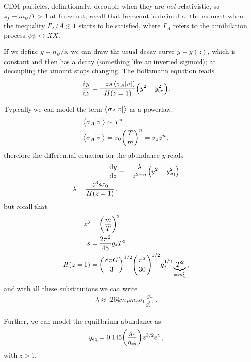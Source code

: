 \documentclass[main.tex]{subfiles}
\begin{document}

CDM particles, definitionally, decouple when they are \emph{not} relativistic, so \(z_f = m_\psi / T > 1\) at freezeout; recall that freezeout is defined as the moment when the inequality \(\Gamma _A / A \lesssim 1\) starts to be satisfied, where \(\Gamma _A\) refers to the annihilation process \(\psi \overline{\psi} \leftrightarrow X \overline{X}\). 

If we define \(y = n_\psi / s\), we can draw the usual decay curve \(y = y(z)\), which is constant and then has a decay (something like an inverted sigmoid); at decoupling the amount stops changing. 
The Boltzmann equation reads 
%
\begin{align}
\dv{y}{z} = \frac{- zs \expval{\sigma _A \abs{v}}}{H (z=1)} \qty(y^2 - y^2 _{\text{eq}})
\,.
\end{align}

Typically we can model the term \(\expval{\sigma_A \abs{v}}\) as a powerlaw: 
%
\begin{align}
\expval{\sigma_A \abs{v}} &\sim T^{n} \\
\expval{\sigma_A \abs{v}} &= \sigma_0 \qty( \frac{T}{m})^{n} = \sigma_0 \overline{z}^{n}
\,,
\end{align}
%
therefore the differential equation for the abundance \(y\) reads 
%
\begin{align}
\dv{y}{z} &= - \frac{\lambda}{z^{2 + n}} \qty(y^2 - y^2 _{\text{eq}}) \\
\lambda = \frac{z^3 s \sigma_0 }{H(z=1)}
\,,
\end{align}
%
but recall that 
%
\begin{align}
z^3 &= \qty( \frac{m}{T})^3  \\
s &= \frac{2 \pi^2}{45} g_* T^3  \\
H(z=1) &=  \qty(\frac{8 \pi G}{3})^{1/2} \qty(\frac{\pi^2}{30})^{1/2}
g_*^{1/2} \underbrace{T^2}_{= m_\psi^2}
\,,
\end{align}
%
and with all these substitutions we can write 
%
\begin{align}
\lambda \approx \num{.264} m_P m_\psi \sigma_0 \frac{g_{*s}}{g_*^{1/2}}
\,.
\end{align}

Further, we can model the equilibrium abundance as 
%
\begin{align}
y _{\text{eq}} = \num{.145} \qty(\frac{g_*}{g_{*s}}) z^{3/2} e^{z}
\,,
\end{align}
%
with \(z > 1\). 
\end{document}
